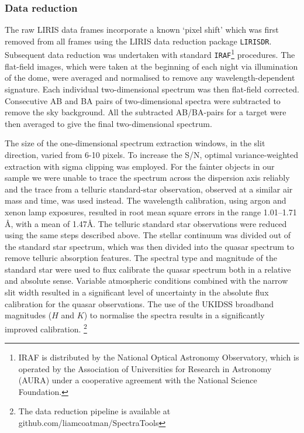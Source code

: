 \subsubsection{Data reduction}

The raw LIRIS data frames incorporate a known `pixel shift' which was first removed from all frames using the LIRIS data reduction package {\tt LIRISDR}. 
Subsequent data reduction was undertaken with standard {\tt IRAF}\footnote{IRAF is distributed by the National Optical Astronomy Observatory, which is operated by the Association of Universities for Research in Astronomy (AURA) under a cooperative agreement with the National Science Foundation.} procedures.  
The flat-field images, which were taken at the beginning of each night via illumination of the dome, were averaged and normalised to remove any wavelength-dependent signature. 
Each individual two-dimensional spectrum was then flat-field corrected. 
Consecutive AB and BA pairs of two-dimensional spectra were subtracted to remove the sky background. 
All the subtracted AB/BA-pairs for a target were then averaged to give the final two-dimensional spectrum.

The size of the one-dimensional spectrum extraction windows, in the slit direction, varied from 6-10 pixels. 
To increase the S/N, optimal variance-weighted extraction with sigma clipping was employed. 
For the fainter objects in our sample we were unable to trace the spectrum across the dispersion axis reliably and the trace from a telluric standard-star observation, observed at a similar air mass and time, was used instead. 
The wavelength calibration, using argon and xenon lamp exposures, resulted in root mean square errors in the range 1.01--1.71\,\AA, with a mean of 1.47\AA. 
The telluric standard star observations were reduced using the same steps described above. 
The stellar continuum was divided out of the standard star spectrum, which was then divided into the quasar spectrum to remove telluric absorption features. 
The spectral type and magnitude of the standard star were used to flux calibrate the quasar spectrum both in a relative and absolute sense.
Variable atmospheric conditions combined with the narrow slit width resulted in a significant level of uncertainty in the absolute flux calibration for the quasar observations. 
The use of the UKIDSS broadband magnitudes ($H$ and $K$) to normalise the spectra results in a significantly improved calibration. 
\footnote{The data reduction pipeline is available at github.com/liamcoatman/SpectraTools}

